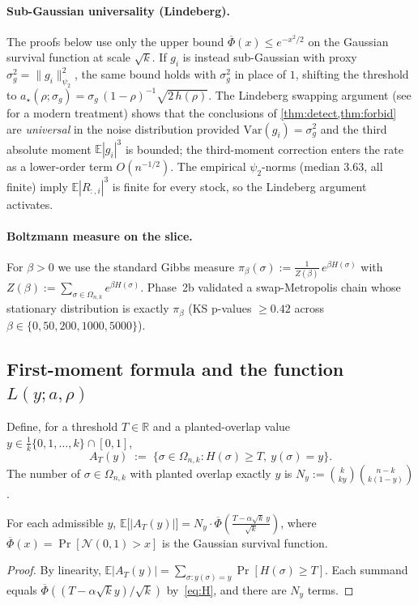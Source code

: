 \paragraph{Sub-Gaussian universality (Lindeberg).} The proofs below use only the upper
bound $\overline\Phi(x)\le e^{-x^2/2}$ on the Gaussian survival function at scale
$\sqrt k$. If $g_i$ is instead sub-Gaussian with proxy $\sigma_g^2 = \|g_i\|_{\psi_2}^2$,
the same bound holds with $\sigma_g^2$ in place of $1$, shifting the threshold to
$a_\star(\rho;\sigma_g) = \sigma_g\,(1-\rho)^{-1}\sqrt{2\,h(\rho)}$. The Lindeberg
swapping argument \cite{lindeberg} (see \cite[Ch.~11.1]{vershynin} for a modern treatment)
shows that the conclusions of \cref{thm:detect,thm:forbid} are \emph{universal} in the
noise distribution provided $\mathrm{Var}(g_i)=\sigma_g^2$ and the third absolute moment
$\mathbb E|g_i|^3$ is bounded; the third-moment correction enters the rate as a
lower-order term $O(n^{-1/2})$. The empirical $\psi_2$-norms (median $3.63$, all finite)
imply $\mathbb E|R_{:,i}|^3$ is finite for every stock, so the Lindeberg argument
activates.

\paragraph{Boltzmann measure on the slice.} For $\beta>0$ we use the standard Gibbs measure
$\pi_\beta(\sigma) := \frac{1}{Z(\beta)}\,e^{\beta H(\sigma)}$ with
$Z(\beta) := \sum_{\sigma\in\Omega_{n,k}} e^{\beta H(\sigma)}$. Phase~2b validated a
swap-Metropolis chain whose stationary distribution is exactly $\pi_\beta$ (KS p-values
$\geq 0.42$ across $\beta\in\{0,50,200,1000,5000\}$).

\subsection{First-moment formula and the function $L(y;a,\rho)$}

Define, for a threshold $T\in\mathbb R$ and a planted-overlap value $y\in
\frac{1}{k}\{0,1,\dots,k\}\cap[0,1]$,
\[
A_T(y) \;:=\; \bigl\{\sigma\in\Omega_{n,k} : H(\sigma)\geq T,\ y(\sigma)=y\bigr\}.
\]
The number of $\sigma\in\Omega_{n,k}$ with planted overlap exactly $y$ is
$N_y := \binom{k}{ky}\binom{n-k}{k(1-y)}$.

\begin{lemma}\label{lem:firstmoment}
For each admissible $y$, $\mathbb E\bigl[|A_T(y)|\bigr] = N_y\cdot\overline\Phi\!\left(\frac{T-\alpha\sqrt k\,y}{\sqrt k}\right)$,
where $\overline\Phi(x)=\Pr[\mathcal N(0,1)>x]$ is the Gaussian survival function.
\end{lemma}
\begin{proof}
By linearity, $\mathbb E|A_T(y)| = \sum_{\sigma:y(\sigma)=y}\Pr[H(\sigma)\geq T]$. Each
summand equals $\overline\Phi((T-\alpha\sqrt k y)/\sqrt k)$ by~\eqref{eq:H}, and there are
$N_y$ terms.
\end{proof}

